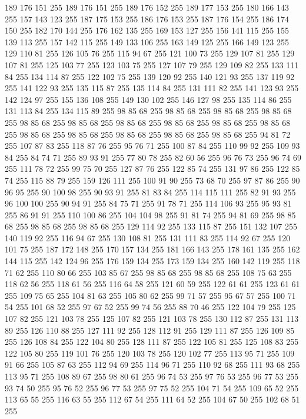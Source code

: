 189 176 151 255 189 176 151 255 189 176 152 255 189 177 153 255 180 166 143 255 157 143 123 255 187 175 153 255 186 176 153 255 187 176 154 255 186 174 150 255 182 170 144 255 176 162 135 255 169 153 127 255 156 141 115 255 155 139 113 255 157 142 115 255 149 133 106 255 163 149 125 255 166 149 123 255 129 110 81 255 126 105 76 255 115 94 67 255 121 100 73 255 129 107 81 255 129 107 81 255 125 103 77 255 123 103 75 255 127 107 79 255 129 109 82 255 133 111 84 255 134 114 87 255 122 102 75 255 139 120 92 255 140 121 93 255 137 119 92 255 141 122 93 255 135 115 87 255 135 114 84 255 131 111 82 255 141 123 93 255 142 124 97 255 155 136 108 255 149 130 102 255 146 127 98 255 135 114 86 255 131 113 84 255 134 115 89 255 98 85 68 255 98 85 68 255 98 85 68 255 98 85 68 255 98 85 68 255 98 85 68 255 98 85 68 255 98 85 68 255 98 85 68 255 98 85 68 255 98 85 68 255 98 85 68 255 98 85 68 255 98 85 68 255 98 85 68 255 94 81 72 255 107 87 83 255
118 87 76 255 95 76 71 255 100 87 84 255 110 99 92 255 109 93 84 255 84 74 71 255 89 93 91 255 77 80 78 255 82 60 56 255 96 76 73 255 96 74 69 255 111 78 72 255 99 75 70 255 127 87 76 255 122 85 74 255 131 97 86 255 122 85 74 255 115 88 79 255 159 126 111 255 100 91 90 255 73 68 70 255 97 87 86 255 90 96 95 255 90 100 98 255 90 93 91 255 81 83 84 255 114 115 111 255 82 91 93 255 96 100 100 255 90 94 91 255 84 75 71 255 91 78 71 255 114 106 93 255 95 93 81 255 86 91 91 255 110 100 86 255 104 104 98 255 91 81 74 255 94 81 69 255 98 85 68 255 98 85 68 255 98 85 68 255 129 114 92 255 133 115 87 255 151 132 107 255 140 119 92 255 116 94 67 255 130 108 81 255 131 111 83 255 114 92 67 255 120 101 75 255 187 172 148 255 170 157 134 255 181 166 143 255 178 161 135 255 162 144 115 255 142 124 96 255 176 159 134 255 173 159 134 255 160 142 119 255 118 71 62 255 110 80 66 255 103 85 67 255 98 85 68 255
98 85 68 255 108 75 63 255 118 62 56 255 118 61 56 255 116 64 58 255 121 60 59 255 122 61 61 255 123 61 61 255 109 75 65 255 104 81 63 255 105 80 62 255 99 71 57 255 95 67 57 255 100 71 54 255 101 68 52 255 97 67 52 255 99 74 56 255 88 70 46 255 122 104 79 255 125 107 82 255 121 103 78 255 125 107 82 255 121 103 78 255 130 112 87 255 131 113 89 255 126 110 88 255 127 111 92 255 128 112 91 255 129 111 87 255 126 109 85 255 126 108 84 255 122 104 80 255 128 111 87 255 122 105 81 255 125 108 83 255 122 105 80 255 119 101 76 255 120 103 78 255 120 102 77 255 113 95 71 255 109 91 66 255 105 87 63 255 112 94 69 255 114 96 71 255 110 92 68 255 111 93 68 255 113 95 71 255 108 89 67 255 98 80 61 255 96 74 53 255 97 76 53 255 96 77 53 255 93 74 50 255 95 76 52 255 96 77 53 255 97 75 52 255 104 71 54 255 109 65 52 255 113 65 55 255 116 63 55 255 112 67 54 255 111 64 52 255 104 67 50 255 102 68 51 255
